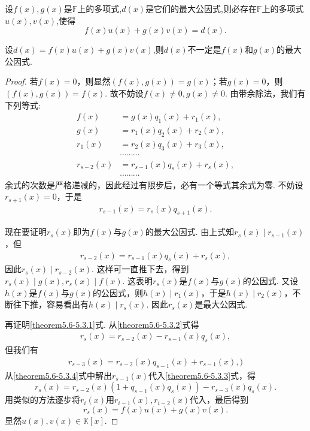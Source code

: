 \documentclass[../../main.tex]{subfiles}%
\begin{document}
\begin{theorem}[最大公因式的必要条件]\label{theorem:最大公因式的必要条件}
设\(f(x),g(x)\)是\(\mathbb{F}\)上的多项式,\(d(x)\)是它们的最大公因式,则必存在\(\mathbb{F}\)上的多项式\(u(x),v(x)\),使得\[f(x)u(x)+g(x)v(x)=d(x).\]
\end{theorem}
\begin{remark}
设\(d(x)=f(x)u(x)+g(x)v(x)\),则\(d(x)\)不一定是\(f(x)\)和\(g(x)\)的最大公因式.
\end{remark}
\begin{proof}

若\(f(x)=0\)，则显然\((f(x),g(x)) = g(x)\)；若\(g(x)=0\)，则\((f(x),g(x)) = f(x)\). 故不妨设\(f(x)\neq 0,g(x)\neq 0\). 由带余除法，我们有下列等式:
\begin{align*}
f(x)&=g(x)q_1(x)+r_1(x),\\
g(x)&=r_1(x)q_2(x)+r_2(x),\\
r_1(x)&=r_2(x)q_3(x)+r_3(x),\\
&\cdots\cdots\cdots\\
r_{s - 2}(x)&=r_{s - 1}(x)q_s(x)+r_s(x),\\
&\cdots\cdots\cdots
\end{align*}
余式的次数是严格递减的，因此经过有限步后，必有一个等式其余式为零. 不妨设\(r_{s + 1}(x)=0\)，于是
\begin{align}
r_{s - 1}(x)=r_s(x)q_{s + 1}(x). \label{theorem5.6-5.3.1}
\end{align}

现在要证明\(r_s(x)\)即为\(f(x)\)与\(g(x)\)的最大公因式. 由上式知\(r_s(x)\mid r_{s - 1}(x)\)，但
\begin{align}
r_{s - 2}(x)=r_{s - 1}(x)q_s(x)+r_s(x),\label{theorem5.6-5.3.2}   
\end{align}
因此\(r_s(x)\mid r_{s - 2}(x)\). 这样可一直推下去，得到\(r_s(x)\mid g(x),r_s(x)\mid f(x)\). 这表明\(r_s(x)\)是\(f(x)\)与\(g(x)\)的公因式. 又设\(h(x)\)是\(f(x)\)与\(g(x)\)的公因式，则\(h(x)\mid r_1(x)\)，于是\(h(x)\mid r_2(x)\)，不断往下推，容易看出有\(h(x)\mid r_s(x)\). 因此\(r_s(x)\)是最大公因式.

再证明\eqref{theorem5.6-5.3.1}式. 从\eqref{theorem5.6-5.3.2}式得
\begin{align}
r_s(x)=r_{s - 2}(x)-r_{s - 1}(x)q_s(x),\label{theorem5.6-5.3.3}    
\end{align}
但我们有
\begin{align}
r_{s - 3}(x)=r_{s - 2}(x)q_{s - 1}(x)+r_{s - 1}(x),\label{theorem5.6-5.3.4})    
\end{align}
从\eqref{theorem5.6-5.3.4}式中解出\(r_{s - 1}(x)\)代入\eqref{theorem5.6-5.3.3}式，得
\[
r_s(x)=r_{s - 2}(x)(1 + q_{s - 1}(x)q_s(x))-r_{s - 3}(x)q_s(x).
\]
用类似的方法逐步将\(r_i(x)\)用\(r_{i - 1}(x),r_{i - 2}(x)\)代入，最后得到
\[
r_s(x)=f(x)u(x)+g(x)v(x).
\]
显然\(u(x),v(x)\in\mathbb{K}[x]\).

\end{proof}
\end{document}
